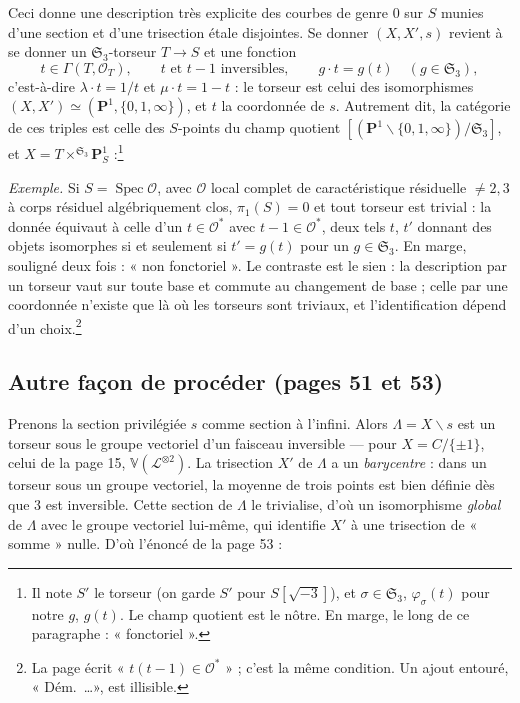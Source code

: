\documentclass[11pt,a4paper]{article}
\begin{document}
Ceci donne une description très explicite des courbes de genre $0$ sur $S$
munies d'une section et d'une trisection étale disjointes. Se donner $(X, X',
s)$ revient à se donner un $\mathfrak{S}_3$-torseur $T \to S$ et une fonction
\[
t \in \Gamma(T, \mathcal{O}_T), \qquad t \text{ et } t - 1 \text{ inversibles},
\qquad g\cdot t = g(t) \quad (g \in \mathfrak{S}_3),
\]
c'est-à-dire $\lambda\cdot t = 1/t$ et $\mu\cdot t = 1 - t$ : le torseur est
celui des isomorphismes $(X, X') \simeq (\mathbf{P}^1, \{0, 1, \infty\})$, et $t$
la coordonnée de $s$. Autrement dit, la catégorie de ces triples est celle des
$S$-points du champ quotient $[(\mathbf{P}^1 \smallsetminus \{0, 1,
\infty\})/\mathfrak{S}_3]$, et $X = T \times^{\mathfrak{S}_3}
\mathbf{P}^1_S$ :\footnote{Il note $S'$ le torseur (on garde $S'$ pour $S[\sqrt{-3}]$), et $\sigma
\in \mathfrak{S}_3$, $\varphi_\sigma(t)$ pour notre $g$, $g(t)$. Le champ
quotient est le nôtre. En marge, le long de ce paragraphe : « fonctoriel ».}



\emph{Exemple.} Si $S = \operatorname{Spec}\mathcal{O}$, avec $\mathcal{O}$
local complet de caractéristique résiduelle $\neq 2, 3$ à corps résiduel
algébriquement clos, $\pi_1(S) = 0$ et tout torseur est trivial : la donnée
équivaut à celle d'un $t \in \mathcal{O}^*$ avec $t - 1 \in \mathcal{O}^*$, deux
tels $t$, $t'$ donnant des objets isomorphes si et seulement si $t' = g(t)$ pour
un $g \in \mathfrak{S}_3$. En marge, souligné deux fois : « non fonctoriel ».
Le contraste est le sien : la description par un torseur vaut sur toute base et
commute au changement de base ; celle par une coordonnée n'existe que là où les
torseurs sont triviaux, et l'identification dépend d'un choix.\footnote{La page
écrit « $t(t-1) \in \mathcal{O}^*$ » ; c'est la même condition. Un ajout
entouré, « Dém.\ \ldots », est illisible.}

\subsection*{Autre façon de procéder (pages 51 et 53)}

Prenons la section privilégiée $s$ comme section à l'infini. Alors $\Lambda = X
\smallsetminus s$ est un torseur sous le groupe vectoriel d'un faisceau
inversible --- pour $X = C/\{\pm 1\}$, celui de la page 15, $\mathbb{V}(\mathcal{L}^{\otimes 2})$.
La trisection $X'$ de $\Lambda$ a un \emph{barycentre} : dans un torseur sous un
groupe vectoriel, la moyenne de trois points est bien définie dès que $3$ est
inversible. Cette section de $\Lambda$ le trivialise, d'où un isomorphisme
\emph{global} de $\Lambda$ avec le groupe vectoriel lui-même, qui identifie $X'$
à une trisection de « somme » nulle. D'où l'énoncé de la page 53 :
\end{document}
